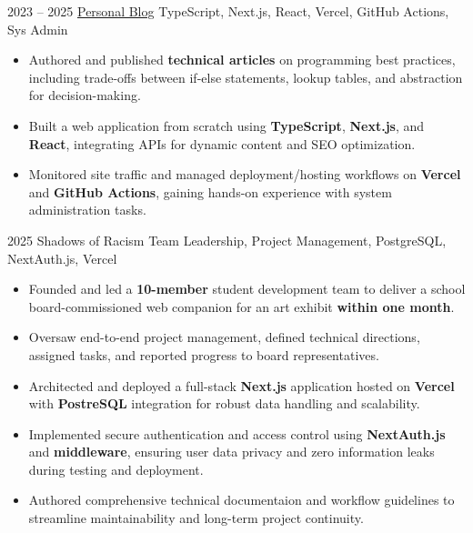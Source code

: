 \documentclass[9pt]{developercv} %
\begin{document}
\begin{entrylist}
    \entry
        {2023 -- 2025}
        {\href{https://www.powerium.io}{Personal Blog}}
        {TypeScript, Next.js, React, Vercel, GitHub Actions, Sys Admin}
        {
        \vspace*{-\baselineskip}
        \begin{itemize}
          \item Authored and published \textbf{technical articles} on programming best practices, including trade-offs between if-else statements, lookup tables, and abstraction for decision-making.
          \item Built a web application from scratch using \textbf{TypeScript}, \textbf{Next.js}, and \textbf{React}, integrating APIs for dynamic content and SEO optimization.
          \item Monitored site traffic and managed deployment/hosting workflows on \textbf{Vercel} and \textbf{GitHub Actions}, gaining hands-on experience with system administration tasks.
        \end{itemize}
        }

    \entry
        {2025}
        {Shadows of Racism}
        {Team Leadership, Project Management, PostgreSQL, NextAuth.js, Vercel}
        {
        \vspace*{-\baselineskip}
        \begin{itemize}
          \item Founded and led a \textbf{10-member} student development team to deliver
            a school board-commissioned web companion for an art exhibit
            \textbf{within one month}.

          \item Oversaw end-to-end project management, defined technical
            directions, assigned tasks, and reported progress
            to board representatives.

          \item Architected and deployed a full-stack \textbf{Next.js} application hosted
            on \textbf{Vercel} with \textbf{PostreSQL} integration for robust
            data handling and scalability. 

          \item Implemented secure authentication and access control using
            \textbf{NextAuth.js} and \textbf{middleware}, ensuring user
            data privacy and zero information leaks during testing and
            deployment.

          \item Authored comprehensive technical documentaion and workflow
            guidelines to streamline maintainability and long-term project
            continuity.
        \end{itemize}
        }
    

\end{entrylist}
\end{document}
